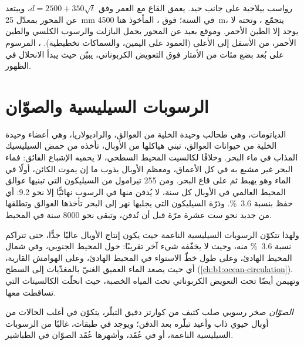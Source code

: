 \begin{omfigure}
{\small رواسب بيلاجية على جانب حيد. يعمق القاع مع العمر وفق  $d = 2500 + 350\sqrt t$، ويبتعد عن المحور بمعدّل \qty{25}{mm} في السنة؛ فوق ، المأخوذ هنا \qty{4500}{m}، يتجمّع ، وتحته لا يوجد إلا الطين الأحمر. وموقع بعيد عن المحور يحمل البازلت والرسوب الكلسي والطين الأحمر، من الأسفل إلى الأعلى (العمود على اليمين، والسماكات تخطيطية). ، المرسوم على بُعد بضع مئات من الأمتار فوق التعويض الكربوناتي، يبيّن حيث يبدأ الانحلال في الظهور.}
\label{fig:b1:chemical-biogenic-sediments:flank}
\end{omfigure}

\section{الرسوبات السيليسية والصوّان}\label{sec:b1:chemical-biogenic-sediments:silica}

الدياتومات، وهي طحالب وحيدة الخلية من العوالق، والراديولاريا، وهي أعضاء وحيدة الخلية من حيوانات العوالق، تبني هياكلها من الأوبال، تأخذه من حمض السيليسيك المذاب في ماء البحر. وخلافًا لكالسيت المحيط السطحي، لا يحميه الإشباع الفائق: فماء البحر غير مشبع به في كل الأعماق، ومعظم الأوبال يذوب ما إن يموت الكائن، أولًا في الماء وهو يهبط ثم على قاع البحر. ومن 255 تيرامول من السيليكون التي تبنيها عوالق المحيط العالمي في الأوبال كل سنة، لا يُدفن منها في الرسوب نهائيًّا إلا نحو 9.2: أي حفظ بنسبة \qty{3.6}{\%}. وذرّة السيليكون التي يجلبها نهر إلى البحر تأخذها العوالق وتطلقها من جديد نحو ست عشرة مرّة قبل أن تُدفن، وتبقى نحو \num{8000} سنة في المحيط.

ولهذا تتكوّن الرسوبات السيليسية الناعمة حيث يكون إنتاج الأوبال عاليًا جدًّا، حتى تتراكم نسبة \qty{3.6}{\%} منه، وحيث لا يخفّفه شيء آخر تقريبًا: حول المحيط الجنوبي، وفي شمال المحيط الهادئ، وعلى طول خطّ الاستواء في المحيط الهادئ، وعلى الهوامش القارية، أي حيث يصعد الماء العميق الغنيّ بالمغذّيات إلى السطح (\cref{ch:b1:ocean-circulation}). وتهيمن أيضًا تحت التعويض الكربوناتي تحت المياه الخصبة، حيث انحلّت الكالسيتات التي تساقطت معها.

\begin{definition}[الصوّان]\label{def:b1:chemical-biogenic-sediments:chert}
\emph{الصوّان} صخر رسوبي صلب كثيف من كوارتز دقيق التبلّر، يتكوّن في أغلب الحالات من أوبال حيوي ذاب وأعيد تبلّره بعد الدفن؛ ويوجد في طبقات، غالبًا من الرسوبات السيليسية الناعمة، أو في عُقَد، وأشهرها عُقَد الصوّان في الطباشير.
\end{definition}

